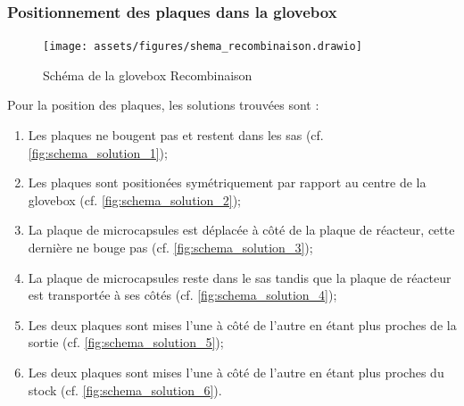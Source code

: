 \subsubsection{Positionnement des plaques dans la \gls{glovebox}}
\begin{figure}[ht]
    \centering
    \texttt{[image: assets/figures/shema\_recombinaison.drawio]}
    \caption{Schéma de la \gls{glovebox} Recombinaison}
    \label{fig:shema_recombinaison}
\end{figure}
Pour la position des plaques, les solutions trouvées sont : 
\begin{enumerate}
    \item Les plaques ne bougent pas et restent dans les sas (cf. \autoref{fig:schema_solution_1});
    \item Les plaques sont positionées symétriquement par rapport au centre de la \gls{glovebox} (cf. \autoref{fig:schema_solution_2});
    \item La plaque de \glspl{microcapsule} est déplacée à côté de la plaque de réacteur, cette dernière ne bouge pas (cf. \autoref{fig:schema_solution_3});
    \item La plaque de \glspl{microcapsule} reste dans le sas tandis que la plaque de réacteur est transportée à ses côtés (cf. \autoref{fig:schema_solution_4});
    \item Les deux plaques sont mises l'une à côté de l'autre en étant plus proches de la sortie (cf. \autoref{fig:schema_solution_5});
    \item Les deux plaques sont mises l'une à côté de l'autre en étant plus proches du stock (cf. \autoref{fig:schema_solution_6}).
\end{enumerate} \label{list:solutions_placement_plaques}
